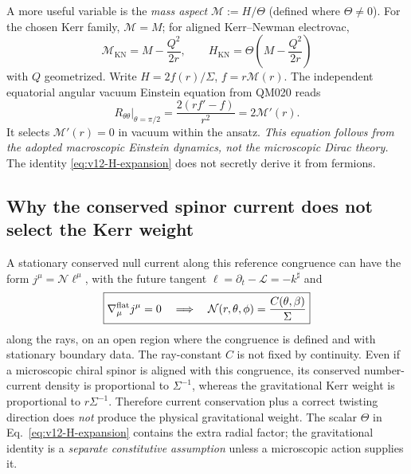 \documentclass[11pt,a4paper]{article}
\begin{document}
A more useful variable is the \emph{mass aspect} $\mathcal M:=H/\Theta$ (defined where $\Theta\ne0$). For the chosen Kerr family, $\mathcal M=M$; for aligned Kerr--Newman electrovac,
\begin{equation}\label{eq:v12-KN-aspect}
\boxed{\mathcal M_{\mathrm{KN}}=M-\frac{Q^2}{2r},\qquad
H_{\mathrm{KN}}=\Theta\left(M-\frac{Q^2}{2r}\right)}
\end{equation}
with $Q$ geometrized. Write $H=2f(r)/\Sigma$, $f=r\mathcal M(r)$. The independent equatorial angular vacuum Einstein equation from QM020 reads
\begin{equation}\label{eq:v12-angular}
\boxed{R_{\theta\theta}|_{\theta=\pi/2}=\frac{2(rf'-f)}{r^2}=2\mathcal M'(r).}
\end{equation}
It selects $\mathcal M'(r)=0$ in vacuum within the ansatz. \emph{This equation follows from the adopted macroscopic Einstein dynamics, not the microscopic Dirac theory.} The identity \eqref{eq:v12-H-expansion} does not secretly derive it from fermions.

\subsection{Why the conserved spinor current does not select the Kerr weight}
A stationary conserved null current along this reference congruence can have the form $j^\mu=\mathcal N\ell^\mu$, with the future tangent $\ell=\partial_t-\mathcal L=-k^\sharp$ and
\begin{equation}\label{eq:v12-conserve}
\boxed{\nabla^{\rm flat}_\mu j^\mu=0\quad\Longrightarrow\quad
\mathcal N(r,\theta,\phi)=\frac{C(\theta,\beta)}{\Sigma}}
\end{equation}
along the rays, on an open region where the congruence is defined and with stationary boundary data. The ray-constant $C$ is not fixed by continuity. Even if a microscopic chiral spinor is aligned with this congruence, its conserved number-current density is proportional to $\Sigma^{-1}$, whereas the gravitational Kerr weight is proportional to $r\Sigma^{-1}$. Therefore current conservation plus a correct twisting direction does \emph{not} produce the physical gravitational weight. The scalar $\Theta$ in Eq.~\eqref{eq:v12-H-expansion} contains the extra radial factor; the gravitational identity is a \emph{separate constitutive assumption} unless a microscopic action supplies it.
\end{document}

